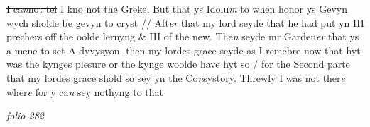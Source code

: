 \documentclass[12pt, a4paper]{book}
\begin{document}
               \sout{I ca\textit{n}not tel} I kno not the Greke. But that ys Idolu\textit{m} to when honor ys Gevyn wych sholde be gevyn to cryst // Aft\textit{er }that my lord seyde that he had put yn III prechers off the oolde lernyng \& III of the new. The\textit{n}  seyde mr Garden\textit{er} that ys a mene to set A dyvysyon. then my lordes grace seyde as I remebre now
			 that hyt was the kynges plesure or the kynge woolde have hyt so / for the Second parte that my lordes grace shold so sey yn the Co\textit{n}systory. Threwly I was not ther\textit{e} wher\textit{e} for y ca\textit{n} sey nothyng to that 
			  

\dotfill
					

\textit{folio 282}
\end{document}
